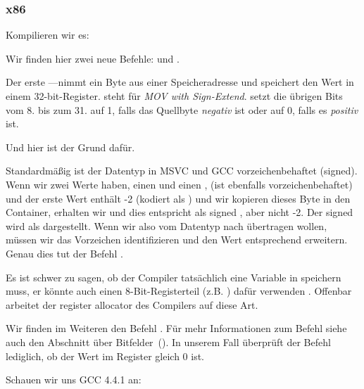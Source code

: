 \subsubsection{x86}


Kompilieren wir es:




Wir finden hier zwei neue Befehle: \MOVSX und \TEST.

\label{MOVSX}

Der erste --\MOVSX--nimmt ein Byte aus einer Speicheradresse und speichert den
Wert in einem 32-bit-Register.
\MOVSX steht für \emph{MOV with Sign-Extend}.
\MOVSX setzt die übrigen Bits vom 8. bis zum 31. auf 1, falls das Quellbyte
\emph{negativ} ist oder auf 0, falls es \emph{positiv} ist.

Und hier ist der Grund dafür.

Standardmäßig ist der \Tchar Datentyp in MSVC und GCC vorzeichenbehaftet
(signed). Wenn wir zwei Werte haben, einen \Tchar und einen \Tint, (\Tint ist
ebenfalls vorzeichenbehaftet) und der erste Wert enthält -2 (kodiert als
) und wir kopieren dieses Byte in den \Tint Container, erhalten wir
 und dies entspricht als signed , aber nicht -2. Der
signed  wird als  dargestellt. Wenn wir also 
vom Datentyp \Tchar nach \Tint übertragen wollen, müssen wir das Vorzeichen
identifizieren und den Wert entsprechend erweitern. Genau dies tut der Befehl
\MOVSX.

Es ist schwer zu sagen, ob der Compiler tatsächlich eine \Tchar Variable in \EDX
speichern muss, er könnte auch einen 8-Bit-Registerteil (z.B. \DL) dafür
verwenden . Offenbar arbeitet der \gls{register allocator} des Compilers auf
diese Art.


Wir finden im Weiteren den Befehl . 
Für mehr Informationen zum \TEST Befehl siehe auch den Abschnitt über
Bitfelder~().
In unserem Fall überprüft der Befehl lediglich, ob der Wert im Register \EDX
gleich 0 ist.


Schauen wir uns GCC 4.4.1 an:




